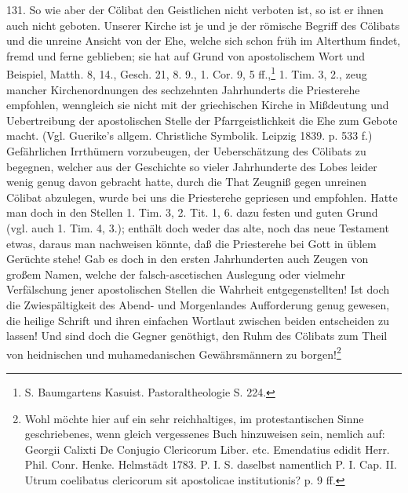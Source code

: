 131. So wie aber der Cölibat den Geistlichen nicht verboten ist, so ist er ihnen auch nicht geboten. Unserer Kirche ist je und je der römische Begriff des Cölibats und
die unreine Ansicht von der Ehe, welche sich schon früh im Alterthum findet, fremd und ferne geblieben; sie hat auf Grund von apostolischem Wort und Beispiel, Matth. 8, 14., Gesch. 21, 8. 9., 1. Cor. 9, 5 ff.,\footnote{S. Baumgartens Kasuist. Pastoraltheologie S. 224.} 1. Tim. 3, 2., zeug mancher Kirchenordnungen des sechzehnten Jahrhunderts die Priesterehe empfohlen, wenngleich sie nicht mit der griechischen Kirche in Mißdeutung und Uebertreibung der apostolischen Stelle der Pfarrgeistlichkeit die Ehe zum Gebote macht. (Vgl. Guerike’s allgem. Christliche Symbolik. Leipzig 1839. p. 533 f.) Gefährlichen Irrthümern vorzubeugen, der Ueberschätzung des Cölibats zu begegnen, welcher aus der Geschichte so vieler Jahrhunderte des Lobes leider wenig genug davon gebracht hatte, durch die That Zeugniß gegen unreinen Cölibat abzulegen, wurde bei uns die Priesterehe gepriesen und empfohlen. Hatte man doch in den Stellen 1. Tim. 3, 2. Tit. 1, 6. dazu festen und guten Grund (vgl. auch 1. Tim. 4, 3.); enthält doch weder das alte, noch das neue Testament etwas, daraus man nachweisen könnte, daß die Priesterehe bei Gott in üblem Gerüchte stehe! Gab es doch in den ersten Jahrhunderten auch Zeugen von großem Namen, welche der falsch-ascetischen Auslegung oder vielmehr Verfälschung jener apostolischen Stellen die Wahrheit entgegenstellten! Ist doch die Zwiespältigkeit des Abend- und Morgenlandes Aufforderung genug gewesen, die heilige Schrift und ihren einfachen Wortlaut zwischen beiden entscheiden zu lassen! Und sind doch die Gegner genöthigt,
den Ruhm des Cölibats zum Theil von heidnischen und muhamedanischen Gewährsmännern zu borgen!\footnote{Wohl möchte hier auf ein sehr reichhaltiges, im protestantischen Sinne geschriebenes, wenn gleich vergessenes Buch hinzuweisen sein, nemlich auf: Georgii Calixti De Conjugio Clericorum Liber. etc. Emendatius edidit Herr. Phil. Conr. Henke. Helmstädt 1783. P. I. S. daselbst namentlich P. I. Cap. II. Utrum coelibatus clericorum sit apostolicae institutionis? p. 9 ff.}

